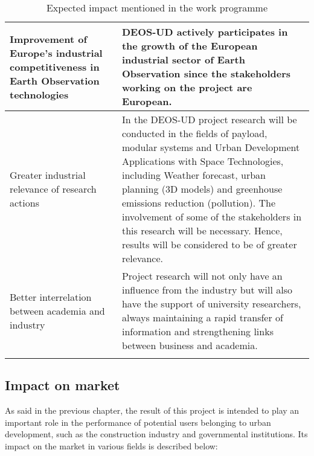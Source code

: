 \begin{longtable}{>{\raggedright\arraybackslash}p{3cm} p{11cm}}
	\midrule
	
	Improvement of Europe’s industrial competitiveness in Earth Observation technologies\vspace{0.2cm} & DEOS-UD actively participates in the growth of the European industrial sector of Earth Observation since the stakeholders working on the project are European.\\
	
	\midrule
	
	Greater industrial relevance of research actions & In the DEOS-UD project research will be conducted in the fields of payload, modular systems and Urban Development Applications with Space Technologies, including Weather forecast, urban planning (3D models) and greenhouse emissions reduction (pollution). The involvement of some of the stakeholders in this research will be necessary. Hence, results will be considered to be of greater relevance.\vspace{0.2cm}\\
	
	\midrule
	
	Better interrelation between academia and industry & Project research will not only have an influence from the industry but will also have the support of university researchers, always maintaining a rapid transfer of information and strengthening links between business and academia.\vspace{0.2cm}\\
	
	\bottomrule[2pt]
	
	\caption{Expected impact mentioned in the work programme}
\end{longtable}

\pagebreak

\subsection{Impact on market}

As said in the previous chapter, the result of this project is intended to play an important role in the performance of potential users belonging to urban development, such as the construction industry and governmental institutions. Its impact on the market in various fields is described below:

